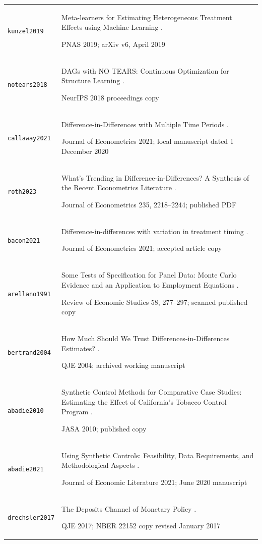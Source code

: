 \begin{longtable}{P{32mm}P{112mm}}
{\scriptsize\texttt{kunzel2019}} & Meta-learners for Estimating Heterogeneous Treatment Effects using Machine Learning \citep{kunzel2019}.\par PNAS 2019; arXiv v6, April 2019\\
{\scriptsize\texttt{notears2018}} & DAGs with NO TEARS: Continuous Optimization for Structure Learning \citep{notears2018}.\par NeurIPS 2018 proceedings copy\\
{\scriptsize\texttt{callaway2021}} & Difference-in-Differences with Multiple Time Periods \citep{callaway2021}.\par Journal of Econometrics 2021; local manuscript dated 1 December 2020\\
{\scriptsize\texttt{roth2023}} & What’s Trending in Difference-in-Differences? A Synthesis of the Recent Econometrics Literature \citep{roth2023}.\par Journal of Econometrics 235, 2218–2244; published PDF\\
{\scriptsize\texttt{bacon2021}} & Difference-in-differences with variation in treatment timing \citep{bacon2021}.\par Journal of Econometrics 2021; accepted article copy\\
{\scriptsize\texttt{arellano1991}} & Some Tests of Specification for Panel Data: Monte Carlo Evidence and an Application to Employment Equations \citep{arellano1991}.\par Review of Economic Studies 58, 277–297; scanned published copy\\
{\scriptsize\texttt{bertrand2004}} & How Much Should We Trust Differences-in-Differences Estimates? \citep{bertrand2004}.\par QJE 2004; archived working manuscript\\
{\scriptsize\texttt{abadie2010}} & Synthetic Control Methods for Comparative Case Studies: Estimating the Effect of California’s Tobacco Control Program \citep{abadie2010}.\par JASA 2010; published copy\\
{\scriptsize\texttt{abadie2021}} & Using Synthetic Controls: Feasibility, Data Requirements, and Methodological Aspects \citep{abadie2021}.\par Journal of Economic Literature 2021; June 2020 manuscript\\
{\scriptsize\texttt{drechsler2017}} & The Deposits Channel of Monetary Policy \citep{drechsler2017}.\par QJE 2017; NBER 22152 copy revised January 2017\\

\end{longtable}
